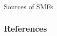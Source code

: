 
\begin{frame}{Sources of SMFs}
    
\end{frame}


\begin{frame}[allowframebreaks]
    \frametitle{References}
    \renewcommand*{\bibfont}{\tiny}
   	\printbibliography[]
    
\end{frame}

\begin{frame}
    
\end{frame}